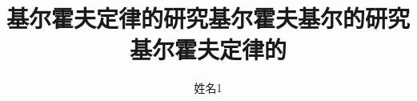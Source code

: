 \documentclass[bachelor, oneside]{NCEPU-thesis}
\title{基尔霍夫定律的研究基尔霍夫基尔的研究基尔霍夫定律的}{English Title and English Title and English Title}
\author{姓名1}{Test1}
\begin{document}
\makecoverbd





\thesistableofcontents











\nocite{*}








\cleardoublepage
\end{document}
